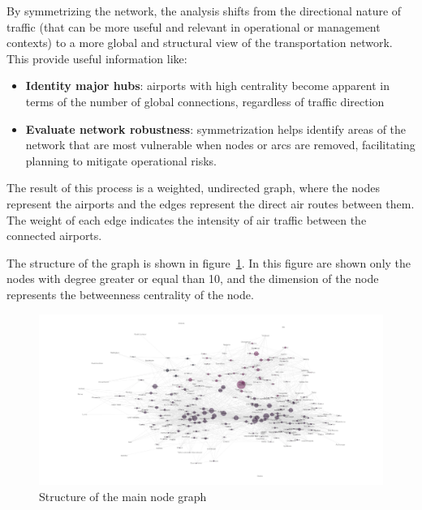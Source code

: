 \documentclass[12pt]{article}
\begin{document}
\begin{itemize}
\begin{itemize}
            \end{itemize}
        By symmetrizing the network, the analysis shifts from the directional nature of traffic (that can be more useful and relevant in operational or management contexts) to a more global and structural view of the transportation network.
        This provide useful information like:
            \begin{itemize}
                \item \textbf{Identity major hubs}: airports with high centrality become apparent in terms of the number of global connections, regardless of traffic direction
                \item \textbf{Evaluate network robustness}: symmetrization helps identify areas of the network that are most vulnerable when nodes or arcs are removed, facilitating planning to mitigate operational risks.
            \end{itemize}
            
    \end{itemize}
    The result of this process is a weighted, undirected graph, where the nodes represent the airports and the edges represent the direct air routes between them. The weight of each edge indicates the intensity of air traffic between the connected airports.

    The structure of the graph is shown in figure~\ref{fig:graph-structure}.
    In this figure are shown only the nodes with degree greater or equal than 10, and the dimension of the node represents the betweenness centrality of the node.
    
    
    \begin{figure}[H]
        \centering
        \includegraphics[width=1\linewidth]{img/graph_structure}
        \caption{Structure of the main node graph}
        \label{fig:graph-structure}
    \end{figure}
\end{document}
